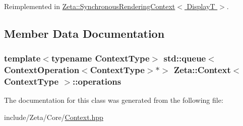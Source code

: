 Reimplemented in \hyperlink{classZeta_1_1SynchronousRenderingContext_afe8b238d3302e2bdb0f2fcc0735c24e3}{Zeta\+::\+Synchronous\+Rendering\+Context$<$ Display\+T $>$}.



\subsection{Member Data Documentation}
\hypertarget{classZeta_1_1Context_a6861c96e000f7ada4f5ca007defbe9a8}{
\subsubsection[{operations}]{\setlength{\rightskip}{0pt plus 5cm}template$<$typename Context\+Type$>$ std\+::queue$<${\bf Context\+Operation}$<$Context\+Type$>$$\ast$$>$ {\bf Zeta\+::\+Context}$<$ Context\+Type $>$\+::operations\hspace{0.3cm}{\ttfamily [protected]}}}\label{classZeta_1_1Context_a6861c96e000f7ada4f5ca007defbe9a8}


The documentation for this class was generated from the following file\+:\begin{DoxyCompactItemize}
\item 
include/\+Zeta/\+Core/\hyperlink{Context_8hpp}{Context.\+hpp}\end{DoxyCompactItemize}
